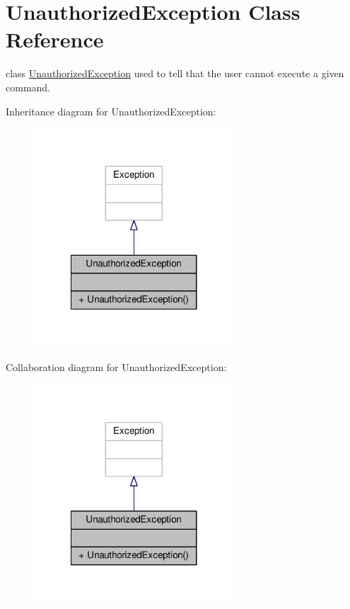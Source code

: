 \hypertarget{classUnauthorizedException}{\section{Unauthorized\-Exception Class Reference}
\label{classUnauthorizedException}
}


class \hyperlink{classUnauthorizedException}{Unauthorized\-Exception} used to tell that the user cannot execute a given command.  




Inheritance diagram for Unauthorized\-Exception\-:
\nopagebreak
\begin{figure}[H]
\begin{center}
\leavevmode
\includegraphics[width=212pt]{classUnauthorizedException__inherit__graph}
\end{center}
\end{figure}


Collaboration diagram for Unauthorized\-Exception\-:
\nopagebreak
\begin{figure}[H]
\begin{center}
\leavevmode
\includegraphics[width=212pt]{classUnauthorizedException__coll__graph}
\end{center}
\end{figure}
